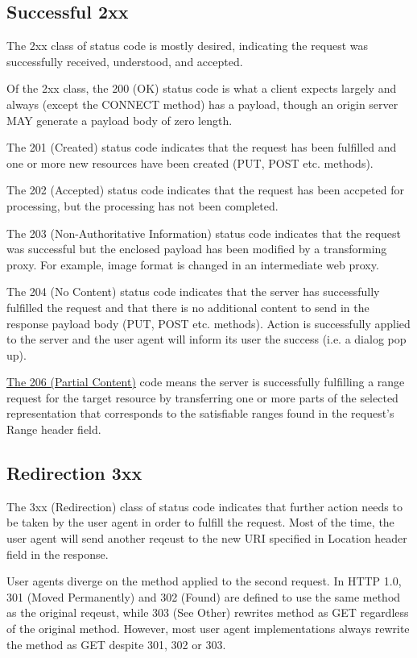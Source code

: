 \subsection{Successful 2xx}
\label{sec:successful-2xx}

The 2xx class of status code is mostly desired, indicating the
request was successfully received, understood, and accepted.

Of the 2xx class, the 200 (OK) status code is what a client
expects largely and always (except the CONNECT method) has a
payload, though an origin server MAY generate a payload body of
zero length.

The 201 (Created) status code indicates that the request has been
fulfilled and one or more new resources have been created (PUT,
POST etc. methods).

The 202 (Accepted) status code indicates that the request has been
accpeted for processing, but the processing has not been
completed.

The 203 (Non-Authoritative Information) status code indicates that
the request was successful but the enclosed payload has been
modified by a transforming proxy. For example, image format is
changed in an intermediate web proxy.

The 204 (No Content) status code indicates that the server has
successfully fulfilled the request and that there is no additional
content to send in the response payload body (PUT, POST
etc. methods). Action is successfully applied to the server and
the user agent will inform its user the success (i.e. a dialog pop
up).

\href{https://tools.ietf.org/html/rfc7233}{The 206 (Partial
  Content)} code means the server is successfully fulfilling a
range request for the target resource by transferring one or more
parts of the selected representation that corresponds to the
satisfiable ranges found in the request's Range header field.

\subsection{Redirection 3xx}
\label{sec:redirection-3xx}

The 3xx (Redirection) class of status code indicates that further
action needs to be taken by the user agent in order to fulfill the
request. Most of the time, the user agent will send another
reqeust to the new URI specified in Location header field in the
response.

User agents diverge on the method applied to the second
request. In HTTP 1.0, 301 (Moved Permanently) and 302 (Found) are
defined to use the same method as the original reqeust, while 303
(See Other) rewrites method as GET regardless of the original
method. However, most user agent implementations always rewrite
the method as GET despite 301, 302 or 303.

